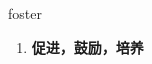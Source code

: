 
\begin{frame}
{\huge foster}
\begin{center}
\begin{enumerate}\Large
  \item \textbf{促进，鼓励，培养}
\end{enumerate}
\end{center}
\end{frame}
